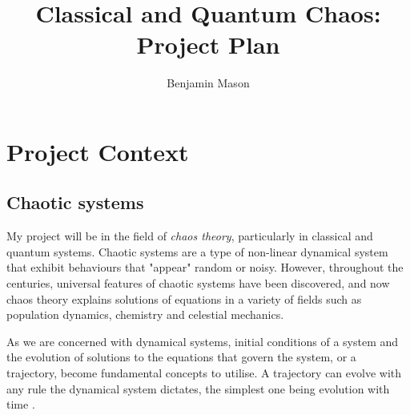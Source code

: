 \documentclass[12pt,a4paper]{amsart}
\title{Classical and Quantum Chaos: Project Plan}
\author{Benjamin Mason}
\begin{document}
\maketitle









\section{Project Context}

\subsection{Chaotic systems}
My project will be in the field of \textit{chaos theory}, particularly in classical and quantum systems. Chaotic systems are a type of non-linear dynamical system that exhibit behaviours that "appear" random or noisy. However, throughout the centuries, universal features of chaotic systems have been discovered, and now chaos theory explains solutions of equations in a variety of fields such as population dynamics, chemistry and celestial mechanics.

As we are concerned with dynamical systems, initial conditions of a system and the evolution of solutions to the equations that govern the system, or a trajectory, become fundamental concepts to utilise. A trajectory can evolve with any rule the dynamical system dictates, the simplest one being evolution with time \cite{HILBORN}.
\end{document}
